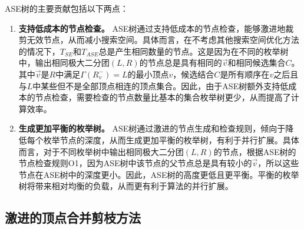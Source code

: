 \begin{example}


\end{example}

ASE树的主要贡献包括以下两点：

\begin{enumerate}
  \item \textbf{支持低成本的节点检查。} ASE树通过支持低成本的节点检查，能够激进地裁剪无效节点，从而减小搜索空间。具体而言，在不考虑其他搜索空间优化方法的情况下，$T_{SE}$和$T_{ASE}$总是产生相同数量的节点。这是因为在不同的枚举树中，输出相同极大二分团$(L,R)$的节点总是具有相同的$\vec{v}$和相同候选集合$C$。其中$\vec{v}$是$R$中满足$\Gamma(R_v^-)=L$的最小顶点$v$，候选结合$C$是所有顺序在$v$之后且与$L$中某些但不是全部顶点相连的顶点集合。因此，由于ASE树额外支持低成本的节点检查，需要检查的节点数量比基本的集合枚举树更少，从而提高了计算效率。

  \item \textbf{生成更加平衡的枚举树。} ASE树通过激进的节点生成和检查规则，倾向于降低每个枚举节点的深度，从而生成更加平衡的枚举树，有利于并行扩展。具体而言，对于不同枚举树中输出相同极大二分团$(L,R)$的节点，根据ASE树的节点检查规则O1，因为ASE树中该节点的父节点总是具有较小的$\vec{v}$，所以这些节点在ASE树中的深度更小。因此，ASE树的高度更低且更平衡。平衡的枚举树将带来相对均衡的负载，从而更有利于算法的并行扩展。

\end{enumerate}

\subsection{激进的顶点合并剪枝方法}
\label{subsec:amp}


